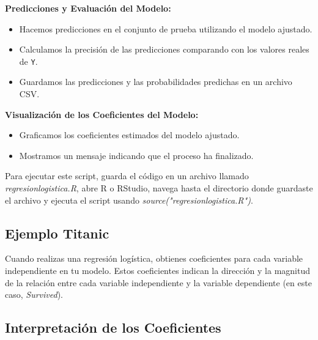 \textbf{Predicciones y Evaluación del Modelo:}

\begin{itemize}
    \item Hacemos predicciones en el conjunto de prueba utilizando el modelo ajustado.
    \item Calculamos la precisión de las predicciones comparando con los valores reales de \texttt{Y}.
    \item Guardamos las predicciones y las probabilidades predichas en un archivo CSV.
\end{itemize}

\textbf{Visualización de los Coeficientes del Modelo:}

\begin{itemize}
    \item Graficamos los coeficientes estimados del modelo ajustado.
    \item Mostramos un mensaje indicando que el proceso ha finalizado.
\end{itemize}

Para ejecutar este script, guarda el código en un archivo llamado \textit{regresionlogistica.R}, abre R o RStudio, navega hasta el directorio donde guardaste el archivo y ejecuta el script usando \textit{source("regresionlogistica.R")}.

\subsection{Ejemplo Titanic}

Cuando realizas una regresión logística, obtienes coeficientes para cada variable independiente en tu modelo. Estos coeficientes indican la dirección y la magnitud de la relación entre cada variable independiente y la variable dependiente (en este caso, \textit{Survived}).

\subsection*{Interpretación de los Coeficientes}

